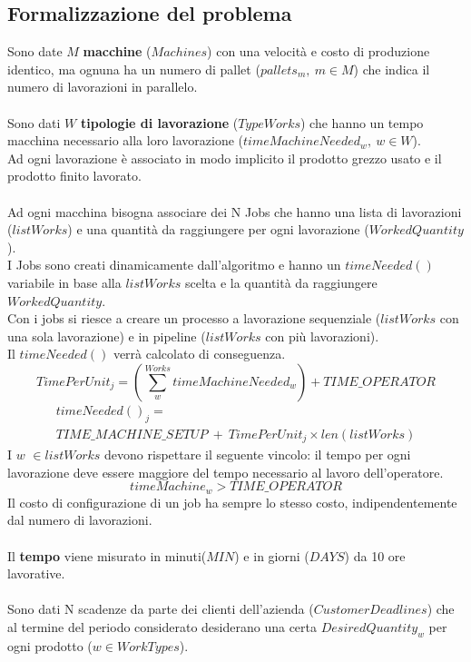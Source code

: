 \subsection{Formalizzazione del problema}
Sono date \(M\) \textbf{macchine} (\(Machines\)) con una velocità e costo di produzione identico, ma ognuna ha un numero di pallet (\(pallets_m,\ m \in M\)) che indica il numero di lavorazioni in parallelo.
\\ \\
Sono dati \(W\) \textbf{tipologie di lavorazione} (\(TypeWorks\)) che hanno un tempo macchina necessario alla loro lavorazione (\(timeMachineNeeded_w,\ w \in W\)).\\
Ad ogni lavorazione è associato in modo implicito il prodotto grezzo usato e il prodotto finito lavorato.
\\\\
Ad ogni macchina bisogna associare dei N Jobs che hanno una lista di lavorazioni (\(listWorks\)) e una quantità da raggiungere per ogni lavorazione (\(WorkedQuantity\)).\\
I Jobs sono creati dinamicamente dall'algoritmo e hanno un \(timeNeeded()\) variabile in base alla \(listWorks\) scelta e la quantità da raggiungere \(WorkedQuantity\).\\
Con i jobs si riesce a creare un processo a lavorazione sequenziale (\(listWorks\) con una sola lavorazione) e in pipeline (\(listWorks\) con più lavorazioni).\\
Il \(timeNeeded()\) verrà calcolato di conseguenza.\\
\begin{equation} \label{eq:TimePerUnit}
    TimePerUnit_j = \left( \sum_{w}^{Works} timeMachineNeeded_w  \right) + TIME\_OPERATOR
\end{equation}
\begin{multline} \label{eq:timeNeeded}
    timeNeeded()_j = \\
    TIME\_MACHINE\_SETUP \ + \ TimePerUnit_j \times len(listWorks)
\end{multline}
I \(w\) \(\in listWorks\) devono rispettare il seguente vincolo: il tempo per ogni lavorazione deve essere maggiore del tempo necessario al lavoro dell'operatore.
\begin{equation} \label{eq:ParallelConstraint}
    timeMachine_w > TIME\_OPERATOR 
\end{equation}
Il costo di configurazione di un job ha sempre lo stesso costo, indipendentemente dal numero di lavorazioni.
\\\\
Il \textbf{tempo} viene misurato in minuti(\(MIN\)) e in giorni (\(DAYS\)) da 10 ore lavorative.
\\\\
Sono dati N scadenze da parte dei clienti dell'azienda (\(CustomerDeadlines\)) che al termine del periodo considerato desiderano una certa \(DesiredQuantity_w\) per ogni prodotto (\(w \in WorkTypes\)).


